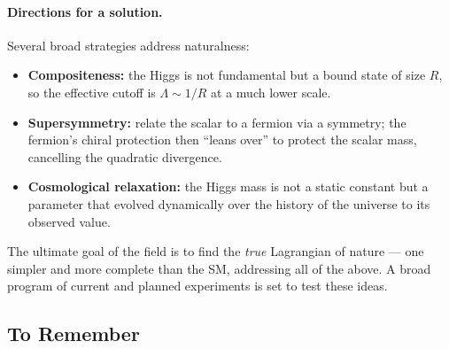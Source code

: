 \paragraph{Directions for a solution.}
Several broad strategies address naturalness:
\begin{itemize}
  \item \textbf{Compositeness:} the Higgs is not fundamental but a bound
        state of size $R$, so the effective cutoff is $\Lambda\sim 1/R$
        at a much lower scale.
  \item \textbf{Supersymmetry:} relate the scalar to a fermion via a
        symmetry; the fermion's chiral protection then ``leans over'' to
        protect the scalar mass, cancelling the quadratic divergence.
  \item \textbf{Cosmological relaxation:} the Higgs mass is not a static
        constant but a parameter that evolved dynamically over the
        history of the universe to its observed value.
\end{itemize}
The ultimate goal of the field is to find the \emph{true} Lagrangian of
nature --- one simpler and more complete than the SM, addressing all of
the above. A broad program of current and planned experiments is set to
test these ideas.

\subsection*{To Remember}

